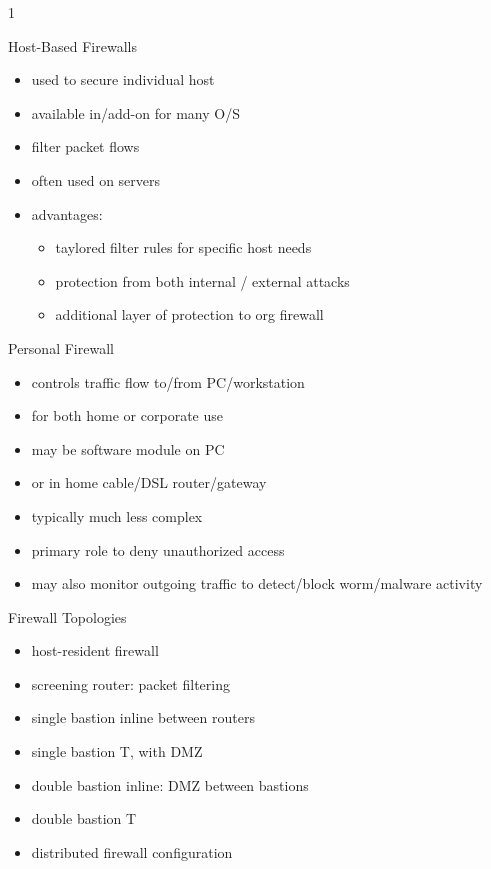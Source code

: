 1\documentclass{beamer}
\begin{document}
\begin{frame}{Host-Based Firewalls}
  \begin{itemize}
  \item used to secure individual host 
  \item available in/add-on for many O/S 
  \item filter packet flows 
  \item often used on servers 
  \item advantages: 
    \begin{itemize}
    \item taylored filter rules for specific host needs 
    \item protection from both internal / external attacks 
    \item additional layer of protection to org firewall 
    \end{itemize}
  \end{itemize}
\end{frame}

\begin{frame}{Personal Firewall}
  \begin{itemize}
  \item controls traffic flow to/from PC/workstation 
  \item for both home or corporate use 
  \item may be software module on PC 
  \item or in home cable/DSL router/gateway 
  \item typically much less complex 
  \item primary role to deny unauthorized access 
  \item may also monitor outgoing traffic to detect/block 
    worm/malware activity
  \end{itemize}
\end{frame}

\begin{frame}{Firewall Topologies}
  \begin{itemize}
  \item host-resident firewall 
  \item screening router: packet filtering 
  \item single bastion inline between routers 
  \item single bastion T, with DMZ 
  \item double bastion inline: DMZ between bastions 
  \item double bastion T 
  \item distributed firewall configuration
  \end{itemize}
\end{frame}
\end{document}
